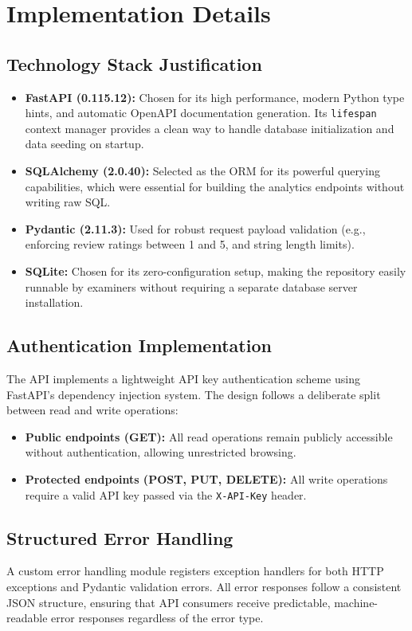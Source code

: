 \documentclass[11pt,a4paper]{article}
\begin{document}
\section{Implementation Details}

\subsection{Technology Stack Justification}
\begin{itemize}[label=\textcolor{primary}{\textbullet}, noitemsep]
    \item \textbf{FastAPI (0.115.12):} Chosen for its high performance, modern Python type hints, and automatic OpenAPI documentation generation. Its \texttt{lifespan} context manager provides a clean way to handle database initialization and data seeding on startup.
    \item \textbf{SQLAlchemy (2.0.40):} Selected as the ORM for its powerful querying capabilities, which were essential for building the analytics endpoints without writing raw SQL.
    \item \textbf{Pydantic (2.11.3):} Used for robust request payload validation (e.g., enforcing review ratings between 1 and 5, and string length limits).
    \item \textbf{SQLite:} Chosen for its zero-configuration setup, making the repository easily runnable by examiners without requiring a separate database server installation.
\end{itemize}

\subsection{Authentication Implementation}
The API implements a lightweight API key authentication scheme using FastAPI's dependency injection system. The design follows a deliberate split between read and write operations:
\begin{itemize}[label=\textcolor{primary}{\textbullet}, noitemsep]
    \item \textbf{Public endpoints (GET):} All read operations remain publicly accessible without authentication, allowing unrestricted browsing.
    \item \textbf{Protected endpoints (POST, PUT, DELETE):} All write operations require a valid API key passed via the \texttt{X-API-Key} header.
\end{itemize}

\subsection{Structured Error Handling}
A custom error handling module registers exception handlers for both HTTP exceptions and Pydantic validation errors. All error responses follow a consistent JSON structure, ensuring that API consumers receive predictable, machine-readable error responses regardless of the error type.
\end{document}
